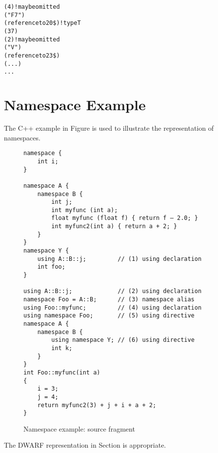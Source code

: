 \begin{alltt}
            (4) ! may be omitted
            ("F7")
            (reference to 20\$) ! type T
            (37)
            (2) ! may be omitted
        ("V")
        (reference to 23\$)
        (...)
        ...
\end{alltt}

\section{Namespace Example}
\label{app:namespaceexample}


The C++ example in 
Figure 
is used 
to illustrate the representation of namespaces.

\begin{figure}[here]
\begin{lstlisting}
namespace {
    int i;
}

namespace A {
    namespace B {
        int j;
        int myfunc (int a);
        float myfunc (float f) { return f – 2.0; }
        int myfunc2(int a) { return a + 2; }
    }
}
namespace Y {
    using A::B::j;         // (1) using declaration
    int foo;
}

using A::B::j;             // (2) using declaration
namespace Foo = A::B;      // (3) namespace alias
using Foo::myfunc;         // (4) using declaration
using namespace Foo;       // (5) using directive
namespace A {
    namespace B {
        using namespace Y; // (6) using directive
        int k;
    }
}
int Foo::myfunc(int a)
{
    i = 3;
    j = 4;
    return myfunc2(3) + j + i + a + 2;
}
\end{lstlisting}
\caption{Namespace example: source fragment} \label{fig:namespaceexamplesourcefragment}
\end{figure}


The DWARF representation in 
Section 
is appropriate.

